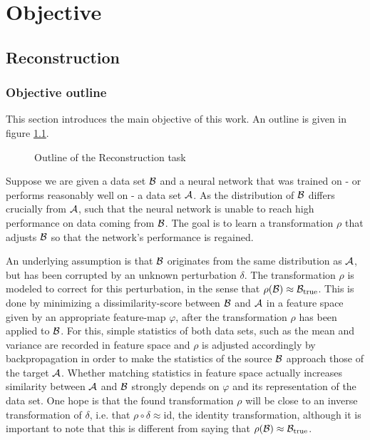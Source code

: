 \chapter{Objective}
\label{chap:Objective}





\section{Reconstruction}
\label{sec:Reconstruction}

\subsection{Objective outline}
This section introduces the main objective of this work. An outline is given in figure \ref{fig:outline}.
\begin{figure}[h]
    \centering
    
    \caption{Outline of the Reconstruction task}
    \label{fig:outline}
    \centering
\end{figure}


Suppose we are given a data set $\mathcal B$ 
and a neural network that was trained on - or performs reasonably well on - a data set $\mathcal A$.
As the distribution of $\mathcal B$ differs crucially from $\mathcal A$, 
such that the neural network is unable to reach high performance on data coming from $\mathcal B$.
The goal is to learn a transformation $\rho$ that adjusts $\mathcal B$ 
so that the network's performance is regained.

An underlying assumption is that $\mathcal B$ originates from the same distribution
as $\mathcal A$, but has been corrupted by an unknown perturbation $\delta$.
The transformation $\rho$ is modeled to correct for this perturbation, 
in the sense that $\rho(\mathcal B) \approx \mathcal B_\text{true}$.
This is done by minimizing a dissimilarity-score between $\mathcal B$ and $\mathcal A$ 
in a feature space given by an appropriate feature-map $\varphi$, 
after the transformation $\rho$ has been applied to $\mathcal B$.
For this, simple statistics of both data sets, such as the mean and variance 
are recorded in feature space and $\rho$ is adjusted accordingly by backpropagation 
in order to make the statistics of the source $\mathcal B$ approach those of the target $\mathcal A$.
%
Whether matching statistics in feature space actually increases similarity between $\mathcal A$ and $\mathcal B$
strongly depends on $\varphi$ and its representation of the data set.
%
One hope is that the found transformation $\rho$ will be close to an inverse transformation
of $\delta$, i.e. that $\rho\circ\delta \approx \text{id}$, the identity transformation,
although it is important to note that this is different from saying that $\rho(\mathcal B) \approx \mathcal B_\text{true}$.


